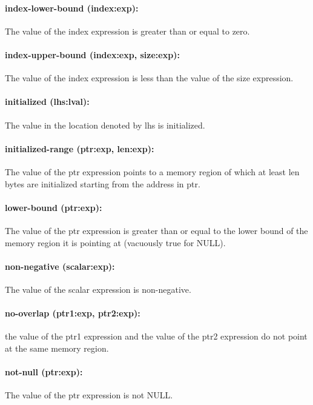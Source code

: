 \documentclass[11pt]{article}
\begin{document}
\paragraph{index-lower-bound (index:exp): }
The value of the index expression is greater than or equal to zero.

\paragraph{index-upper-bound (index:exp, size:exp):}
The value of the index expression is less than the value of the
   size expression. 

\paragraph{initialized (lhs:lval): }
The value in the location denoted by lhs is initialized.

\paragraph{initialized-range (ptr:exp, len:exp): }
The value of the ptr expression points to a memory region of which at least
len bytes are initialized starting from the address in ptr.

\paragraph{lower-bound (ptr:exp):}
The value of the ptr expression is greater than or equal to the
    lower bound of the memory region it is pointing at (vacuously true for NULL).
    
\paragraph{non-negative (scalar:exp):}
The value of the scalar expression is non-negative.

\paragraph{no-overlap (ptr1:exp, ptr2:exp): }
the value of the ptr1 expression and the value of the ptr2
   expression do not point at the same memory region.

\paragraph{not-null (ptr:exp):}
The value of the ptr expression is not NULL.
\end{document}
